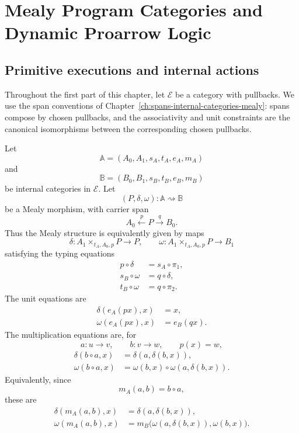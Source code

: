 \chapter{Mealy Program Categories and Dynamic Proarrow Logic}
\label{ch:mealy-program-categories-dynamic-logic}

\section{Primitive executions and internal actions}
\label{sec:primitive-executions-internal-actions}

Throughout the first part of this chapter, let \(\mathcal E\) be a category with pullbacks. We use the span conventions of Chapter~\ref{ch:spans-internal-categories-mealy}: spans compose by chosen pullbacks, and the associativity and unit constraints are the canonical isomorphisms between the corresponding chosen pullbacks.

Let
\[
\mathbb A=(A_0,A_1,s_A,t_A,e_A,m_A)
\]
and
\[
\mathbb B=(B_0,B_1,s_B,t_B,e_B,m_B)
\]
be internal categories in \(\mathcal E\). Let
\[
(P,\delta,\omega):\mathbb A\rightsquigarrow\mathbb B
\]
be a Mealy morphism, with carrier span
\[
A_0\xleftarrow{p}P\xrightarrow{q}B_0.
\]
Thus the Mealy structure is equivalently given by maps
\[
\delta:
A_1\times_{t_A,A_0,p}P\to P,
\qquad
\omega:
A_1\times_{t_A,A_0,p}P\to B_1
\]
satisfying the typing equations
\begin{align}
p\circ\delta&=s_A\circ\pi_1,
\label{eq:prog-pdelta}
\\
s_B\circ\omega&=q\circ\delta,
\label{eq:prog-source-output}
\\
t_B\circ\omega&=q\circ\pi_2.
\label{eq:prog-target-output}
\end{align}
The unit equations are
\begin{align}
\delta(e_A(p x),x)&=x,
\label{eq:prog-delta-unit}
\\
\omega(e_A(p x),x)&=e_B(qx).
\label{eq:prog-omega-unit}
\end{align}
The multiplication equations are, for
\[
a:u\to v,
\qquad
b:v\to w,
\qquad
p(x)=w,
\]
\begin{align}
\delta(b\circ a,x)
&=
\delta(a,\delta(b,x)),
\label{eq:prog-delta-composition}
\\
\omega(b\circ a,x)
&=
\omega(b,x)\circ\omega(a,\delta(b,x)).
\label{eq:prog-omega-composition}
\end{align}
Equivalently, since
\[
m_A(a,b)=b\circ a,
\]
these are
\begin{align}
\delta(m_A(a,b),x)
&=
\delta(a,\delta(b,x)),
\label{eq:prog-delta-composition-m}
\\
\omega(m_A(a,b),x)
&=
m_B\bigl(\omega(a,\delta(b,x)),\omega(b,x)\bigr).
\label{eq:prog-omega-composition-m}
\end{align}

